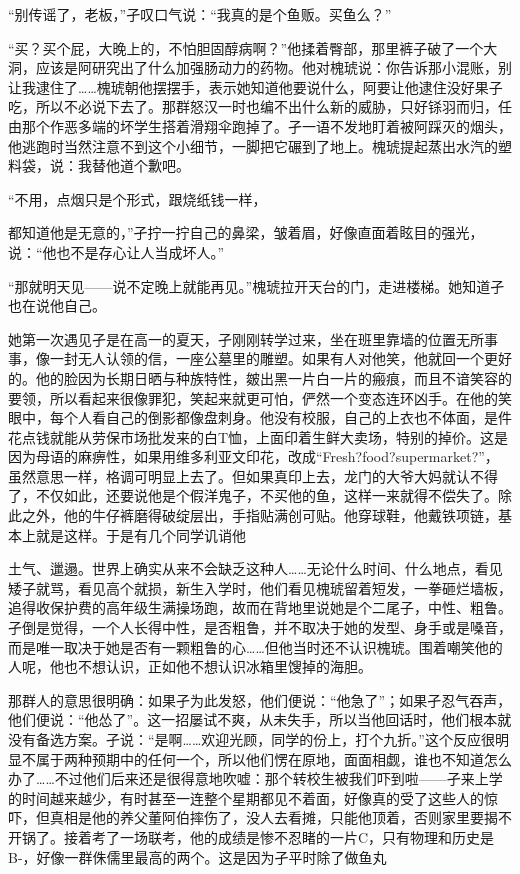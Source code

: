 \documentclass{article}
\begin{document}
“别传谣了，老板，”孑叹口气说：“我真的是个鱼贩。买鱼么？”

“买？买个屁，大晚上的，不怕胆固醇病啊？”他揉着臀部，那里裤子破了一个大洞，应该是阿研究出了什么加强肠动力的药物。他对槐琥说：你告诉那小混账，别让我逮住了……槐琥朝他摆摆手，表示她知道他要说什么，阿要让他逮住没好果子吃，所以不必说下去了。那群怒汉一时也编不出什么新的威胁，只好铩羽而归，任由那个作恶多端的坏学生搭着滑翔伞跑掉了。孑一语不发地盯着被阿踩灭的烟头，他逃跑时当然注意不到这个小细节，一脚把它碾到了地上。槐琥提起蒸出水汽的塑料袋，说：我替他道个歉吧。

“不用，点烟只是个形式，跟烧纸钱一样，

\newpage 

都知道他是无意的，”孑拧一拧自己的鼻梁，皱着眉，好像直面着眩目的强光，说：“他也不是存心让人当成坏人。”

“那就明天见——说不定晚上就能再见。”槐琥拉开天台的门，走进楼梯。她知道孑也在说他自己。

她第一次遇见孑是在高一的夏天，孑刚刚转学过来，坐在班里靠墙的位置无所事事，像一封无人认领的信，一座公墓里的雕塑。如果有人对他笑，他就回一个更好的。他的脸因为长期日晒与种族特性，皴出黑一片白一片的瘢痕，而且不谙笑容的要领，所以看起来很像罪犯，笑起来就更可怕，俨然一个变态连环凶手。在他的笑眼中，每个人看自己的倒影都像盘刺身。他没有校服，自己的上衣也不体面，是件花点钱就能从劳保市场批发来的白T恤，上面印着生鲜大卖场，特别的掉价。这是因为母语的麻痹性，如果用维多利亚文印花，改成“Fresh?food?supermarket?”，虽然意思一样，格调可明显上去了。但如果真印上去，龙门的大爷大妈就认不得了，不仅如此，还要说他是个假洋鬼子，不买他的鱼，这样一来就得不偿失了。除此之外，他的牛仔裤磨得破绽层出，手指贴满创可贴。他穿球鞋，他戴铁项链，基本上就是这样。于是有几个同学讥诮他

\newpage 

土气、邋遢。世界上确实从来不会缺乏这种人……无论什么时间、什么地点，看见矮子就骂，看见高个就损，新生入学时，他们看见槐琥留着短发，一拳砸烂墙板，追得收保护费的高年级生满操场跑，故而在背地里说她是个二尾子，中性、粗鲁。孑倒是觉得，一个人长得中性，是否粗鲁，并不取决于她的发型、身手或是嗓音，而是唯一取决于她是否有一颗粗鲁的心……但他当时还不认识槐琥。围着嘲笑他的人呢，他也不想认识，正如他不想认识冰箱里馊掉的海胆。

那群人的意思很明确：如果孑为此发怒，他们便说：“他急了”；如果孑忍气吞声，他们便说：“他怂了”。这一招屡试不爽，从未失手，所以当他回话时，他们根本就没有备选方案。孑说：“是啊……欢迎光顾，同学的份上，打个九折。”这个反应很明显不属于两种预期中的任何一个，所以他们愣在原地，面面相觑，谁也不知道怎么办了……不过他们后来还是很得意地吹嘘：那个转校生被我们吓到啦——孑来上学的时间越来越少，有时甚至一连整个星期都见不着面，好像真的受了这些人的惊吓，但真相是他的养父董阿伯摔伤了，没人去看摊，只能他顶着，否则家里要揭不开锅了。接着考了一场联考，他的成绩是惨不忍睹的一片C，只有物理和历史是B-，好像一群侏儒里最高的两个。这是因为孑平时除了做鱼丸
\end{document}
